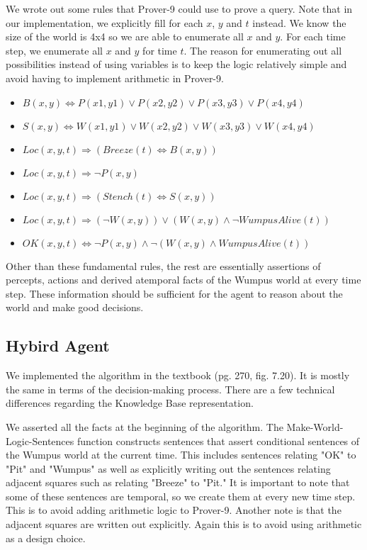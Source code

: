 We wrote out some rules that Prover-9 could use to prove a query. Note that in our implementation, we explicitly fill for each $x$, $y$ and $t$ instead. We know the size of the world is 4x4 so we are able to enumerate all $x$ and $y$. For each time step, we enumerate all $x$ and $y$ for time $t$. The reason for enumerating out all possibilities instead of using variables is to keep the logic relatively simple and avoid having to implement arithmetic in Prover-9.

\begin{itemize}
	\item $B(x,y) \Leftrightarrow P(x1,y1) \vee P(x2,y2) \vee P(x3,y3) \vee P(x4,y4)$
        \item $S(x,y) \Leftrightarrow W(x1,y1) \vee W(x2,y2) \vee W(x3,y3) \vee W(x4,y4)$
        \item $Loc(x,y,t) \Rightarrow (Breeze(t) \Leftrightarrow B(x,y))$
        \item $Loc(x,y,t) \Rightarrow \neg P(x,y)$
        \item $Loc(x,y,t) \Rightarrow (Stench(t) \Leftrightarrow S(x,y))$
        \item $Loc(x,y,t) \Rightarrow (\neg W(x,y)) \vee (W(x,y) \wedge \neg WumpusAlive(t))$
        \item $OK(x,y,t) \Leftrightarrow \neg P(x,y) \wedge \neg(W(x,y) \wedge WumpusAlive(t))$
\end{itemize}

Other than these fundamental rules, the rest are essentially assertions of percepts, actions and derived atemporal facts of the Wumpus world at every time step. These information should be sufficient for the agent to reason about the world and make good decisions.

\subsection{Hybird Agent}

We implemented the algorithm in the textbook (pg. 270, fig. 7.20). It is mostly the same in terms of the decision-making process. There are a few technical differences regarding the Knowledge Base representation.

We asserted all the facts at the beginning of the algorithm. The Make-World-Logic-Sentences function constructs sentences that assert conditional sentences of the Wumpus world at the current time. This includes sentences relating "OK" to "Pit" and "Wumpus" as well as explicitly writing out the sentences relating adjacent squares such as relating "Breeze" to "Pit." It is important to note that some of these sentences are temporal, so we create them at every new time step. This is to avoid adding arithmetic logic to Prover-9. Another note is that the adjacent squares are written out explicitly. Again this is to avoid using arithmetic as a design choice. 

